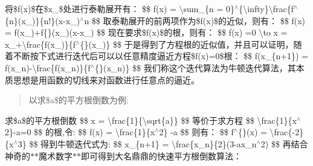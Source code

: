 \begin{DoxyItemize}
\quad{}\quad{}将\$f(x)\$在\$x\+\_\$处进行泰勒展开有： \$\$ f(x) = \textbackslash{}sum\+\_\+\{n = 0\}$^\wedge$\{\textbackslash{}infty\}\textbackslash{}frac\{f$^\wedge$\{n\}(x\+\_)\}\{n!\}(x-\/x\+\_)$^\wedge$n \$\$ 取泰勒展开的前两项作为\$f(x)\$的近似，则有： \$\$ f(x) = f(x\+\_)+f\{\textquotesingle{}\}(x\+\_)(x-\/x\+\_) \$\$ 现在要求\$f(x)\$的根，则有： \$\$ f(x) =0 \textbackslash{}to x = x\+\_+\textbackslash{}frac\{f(x\+\_)\}\{f$^\wedge$\{\textquotesingle{}\}(x\+\_)\} \$\$ 于是得到了方程根的近似值，并且可以证明，随着不断按下式进行迭代后可以以任意精度逼近方程\$f(x)=0\$根： \$\$ f(x\+\_\+\{n+1\}) = f(x\+\_\+n)-\/\textbackslash{}frac\{f(x\+\_\+n)\}\{f$^\wedge$\{\textquotesingle{}\}(x\+\_\+n)\} \$\$ 我们称这个迭代算法为牛顿迭代算法，其本质思想{\ttfamily 是用函数的切线来对函数进行任意点的逼近}。 \begin{quote}
以求\$a\$的平方根倒数为例\+: \end{quote}
\quad{}\quad{}求\$a\$的平方根倒数 \$\$ x = \textbackslash{}frac\{1\}\{\textbackslash{}sqrt\{a\}\} \$\$ 等价于求方程 \$\$ \textbackslash{}frac\{1\}\{x$^\wedge$2\}-\/a=0 \$\$ 的根,令\+: \$\$ f(x) = \textbackslash{}frac\{1\}\{x$^\wedge$2\} -\/a \$\$ 则有： \$\$ f$^\wedge$\{\textquotesingle{}\}(x) = \textbackslash{}frac\{-\/2\}\{x$^\wedge$3\} \$\$ 得到牛顿迭代式为\+: \$\$ x\+\_\+\{n+1\} = \textbackslash{}frac\{x\+\_\+n\}\{2\}(3-\/ax\+\_\+n$^\wedge$2) \$\$ 再结合神奇的$\ast$$\ast$魔术数字$\ast$$\ast$即可得到大名鼎鼎的快速平方根倒数算法： 
\begin{DoxyCode}{0}
\DoxyCodeLine{ \{}
\DoxyCodeLine{ \}}

\end{DoxyCode}
 
\end{DoxyItemize}